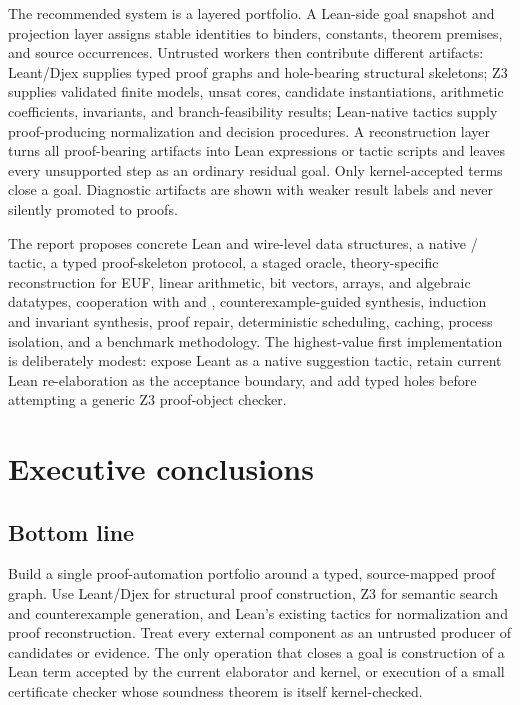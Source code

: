 \documentclass[11pt,letterpaper,openany]{report}
\newcommand{\code}[1]{\texttt{\detokenize{#1}}}
\begin{document}
The recommended system is a layered portfolio. A Lean-side goal snapshot and
projection layer assigns stable identities to binders, constants, theorem premises,
and source occurrences. Untrusted workers then contribute different artifacts:
Leant/Djex supplies typed proof graphs and hole-bearing structural skeletons; Z3
supplies validated finite models, unsat cores, candidate instantiations, arithmetic
coefficients, invariants, and branch-feasibility results; Lean-native tactics supply
proof-producing normalization and decision procedures. A reconstruction layer turns
all proof-bearing artifacts into Lean expressions or tactic scripts and leaves every
unsupported step as an ordinary residual goal. Only kernel-accepted terms close a
goal. Diagnostic artifacts are shown with weaker result labels and never silently
promoted to proofs.

The report proposes concrete Lean and wire-level data structures, a native
\code{leant?}/\code{leant} tactic, a typed proof-skeleton protocol, a staged
\code{z3?} oracle, theory-specific reconstruction for EUF, linear arithmetic, bit
vectors, arrays, and algebraic datatypes, cooperation with \code{grind} and
\code{LibrarySuggestions}, counterexample-guided synthesis, induction and invariant
synthesis, proof repair, deterministic scheduling, caching, process isolation, and a
benchmark methodology. The highest-value first implementation is deliberately
modest: expose Leant as a native suggestion tactic, retain current Lean
re-elaboration as the acceptance boundary, and add typed holes before attempting a
generic Z3 proof-object checker.

\tableofcontents
\clearpage
{}

\chapter{Executive conclusions}
\label{ch:executive}

\section{Bottom line}

\begin{keybox}[title=Primary recommendation]
Build a single proof-automation portfolio around a typed, source-mapped proof graph.
Use Leant/Djex for structural proof construction, Z3 for semantic search and
counterexample generation, and Lean's existing tactics for normalization and proof
reconstruction. Treat every external component as an untrusted producer of
candidates or evidence. The only operation that closes a goal is construction of a
Lean term accepted by the current elaborator and kernel, or execution of a small
certificate checker whose soundness theorem is itself kernel-checked.
\end{keybox}
\end{document}

